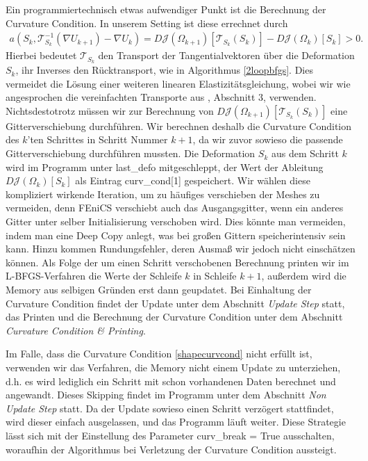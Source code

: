 Ein programmiertechnisch etwas aufwendiger Punkt ist die Berechnung der Curvature Condition. In unserem Setting ist diese errechnet durch 
\begin{equation}
\label{shapecurvcond}
\begin{aligned}
	a(S_k, \mathcal{T}_{S_k}^{-1}(\nabla U_{k+1}) - \nabla U_k) = D\mathcal{J}(\Omega_{k+1})[\mathcal{T}_{S_k}(S_k)] - D\mathcal{J}(\Omega_k)[S_k] > 0.
\end{aligned}
\end{equation}
Hierbei bedeutet $\mathcal{T}_{S_k}$ den Transport der Tangentialvektoren über die  Deformation $S_k$, ihr Inverses den Rücktransport, wie in Algorithmus \ref{2loopbfgs}. Dies vermeidet die Lösung einer weiteren linearen Elastizitätsgleichung, wobei wir wie angesprochen die vereinfachten Transporte aus \cite{diffusion}, Abschnitt 3, verwenden. Nichtsdestotrotz müssen wir zur Berechnung von $D\mathcal{J}(\Omega_{k+1})[\mathcal{T}_{S_k}(S_k)]$ eine Gitterverschiebung durchführen. Wir berechnen deshalb die Curvature Condition des $k$'ten Schrittes in Schritt Nummer $k+1$, da wir zuvor sowieso die passende Gitterverschiebung durchführen mussten. Die Deformation $S_k$ aus dem Schritt $k$ wird im Programm unter \textsf{last\_defo} mitgeschleppt, der Wert der Ableitung $D\mathcal{J}(\Omega_k)[S_k]$ als Eintrag \textsf{curv\_cond[1]} gespeichert. Wir wählen diese kompliziert wirkende Iteration, um zu häufiges verschieben der Meshes zu vermeiden, denn FEniCS verschiebt auch das Ausgangsgitter, wenn ein anderes Gitter unter selber Initialisierung verschoben wird. Dies könnte man vermeiden, indem man eine Deep Copy anlegt, was bei großen Gittern speicherintensiv sein kann. Hinzu kommen Rundungsfehler, deren Ausmaß wir jedoch nicht einschätzen können.
Als Folge der um einen Schritt verschobenen Berechnung printen wir im L-BFGS-Verfahren die Werte der Schleife $k$ in Schleife $k+1$, außerdem wird die Memory aus selbigen Gründen erst dann geupdatet. Bei Einhaltung der Curvature Condition findet der Update unter dem Abschnitt \textit{Update Step} statt, das Printen und die Berechnung der Curvature Condition unter dem Abschnitt \textit{Curvature Condition \& Printing}. 

Im Falle, dass die Curvature Condition \ref{shapecurvcond} nicht erfüllt ist, verwenden wir das Verfahren, die Memory nicht einem Update zu unterziehen, d.h. es wird lediglich ein Schritt mit schon vorhandenen Daten berechnet und angewandt. Dieses Skipping findet im Programm unter dem Abschnitt \textit{Non Update Step} statt. Da der Update sowieso einen Schritt verzögert stattfindet, wird dieser einfach ausgelassen, und das Programm läuft weiter. Diese Strategie lässt sich mit der Einstellung des Parameter \textsf{curv\_break = True} ausschalten, woraufhin der Algorithmus bei Verletzung der Curvature Condition aussteigt.

